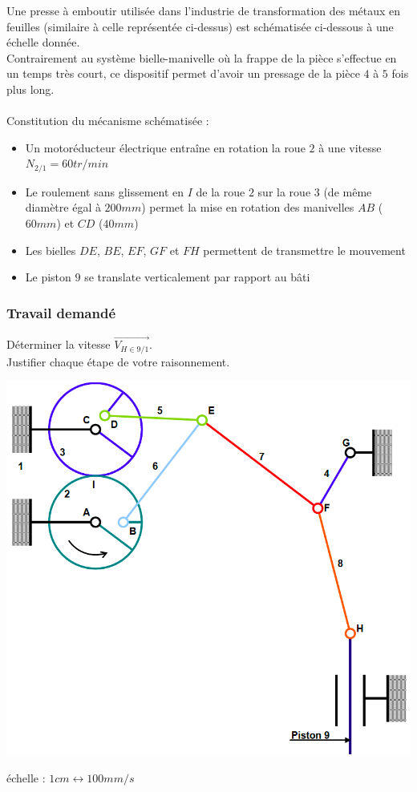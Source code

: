 Une presse à emboutir utilisée dans l’industrie de transformation des métaux en feuilles (similaire à celle représentée ci-dessus) est schématisée ci-dessous à une échelle donnée.\\
Contrairement au système bielle-manivelle où la frappe de la pièce s’effectue en un temps très court, ce dispositif permet d’avoir un pressage de la pièce $4$ à $5$ fois plus long.\\
\\
Constitution du mécanisme schématisée :
\begin{itemize}
\item Un motoréducteur électrique entraîne en rotation la roue $2$ à une vitesse $N_{2/1}= 60 tr/min$
\item Le roulement sans glissement en $I$ de la roue $2$ sur la roue $3$ (de même diamètre égal à $200 mm$) permet la mise en rotation des manivelles $AB$ ($60 mm$) et $CD$ ($40 mm$)
\item Les bielles $DE$, $BE$, $EF$, $GF$ et $FH$ permettent de transmettre le mouvement
\item Le piston $9$ se translate verticalement par rapport au bâti
\end{itemize}

\subsubsection{Travail demandé}
Déterminer la vitesse $\overrightarrow{V_{H\in9/1}}$.\\
Justifier chaque étape de votre raisonnement.

\newpage
\vspace{5cm}
\begin{center}
    \includegraphics[scale=0.45]{png/2_exo9.png}
\end{center}
échelle : $1cm \leftrightarrow 100mm/s$


